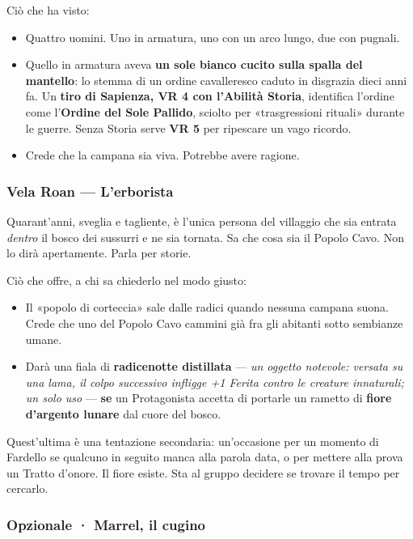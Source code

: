 \documentclass[10pt,a4paper]{article}
\newcommand{\tightlist}{\setlength{\itemsep}{0pt}\setlength{\parskip}{0pt}}
\begin{document}
Ciò che ha visto:

\begin{itemize}
\tightlist
\item
  Quattro uomini. Uno in armatura, uno con un arco lungo, due con pugnali.
\item
  Quello in armatura aveva \textbf{un sole bianco cucito sulla spalla del mantello}: lo stemma di un ordine cavalleresco caduto in disgrazia dieci anni fa. Un \textbf{tiro di Sapienza, VR 4 con l'Abilità Storia}, identifica l'ordine come l'\textbf{Ordine del Sole Pallido}, sciolto per «trasgressioni rituali» durante le guerre. Senza Storia serve \textbf{VR 5} per ripescare un vago ricordo.
\item
  Crede che la campana sia viva. Potrebbe avere ragione.
\end{itemize}

\subsubsection{Vela Roan --- L'erborista}\label{vela-roan-lerborista}

Quarant'anni, sveglia e tagliente, è l'unica persona del villaggio che sia entrata \emph{dentro} il bosco dei sussurri e ne sia tornata. Sa che cosa sia il Popolo Cavo. Non lo dirà apertamente. Parla per storie.

Ciò che offre, a chi sa chiederlo nel modo giusto:

\begin{itemize}
\tightlist
\item
  Il «popolo di corteccia» sale dalle radici quando nessuna campana suona. Crede che uno del Popolo Cavo cammini già fra gli abitanti sotto sembianze umane.
\item
  Darà una fiala di \textbf{radicenotte distillata} --- \emph{un oggetto notevole: versata su una lama, il colpo successivo infligge +1 Ferita contro le creature innaturali; un solo uso} --- \textbf{se} un Protagonista accetta di portarle un rametto di \textbf{fiore d'argento lunare} dal cuore del bosco.
\end{itemize}

Quest'ultima è una tentazione secondaria: un'occasione per un momento di Fardello se qualcuno in seguito manca alla parola data, o per mettere alla prova un Tratto d'onore. Il fiore esiste. Sta al gruppo decidere se trovare il tempo per cercarlo.

\subsubsection{Opzionale · Marrel, il cugino}\label{opzionale-marrel-il-cugino}
\end{document}
